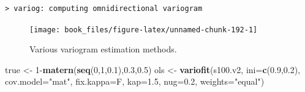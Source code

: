 \documentclass[b5paper,]{book}
\makeatletter
\newenvironment{Shaded}{\begin{snugshade}}{\end{snugshade}}
\newcommand{\KeywordTok}[1]{\textcolor[rgb]{0.13,0.29,0.53}{\textbf{{#1}}}}
\newcommand{\DataTypeTok}[1]{\textcolor[rgb]{0.13,0.29,0.53}{{#1}}}
\newcommand{\DecValTok}[1]{\textcolor[rgb]{0.00,0.00,0.81}{{#1}}}
\newcommand{\FloatTok}[1]{\textcolor[rgb]{0.00,0.00,0.81}{{#1}}}
\newcommand{\StringTok}[1]{\textcolor[rgb]{0.31,0.60,0.02}{{#1}}}
\newcommand{\NormalTok}[1]{{#1}}
\newenvironment{kframe}{%
\medskip{}
\setlength{\fboxsep}{.8em}
 \def\at@end@of@kframe{}%
 \ifinner\ifhmode%
  \def\at@end@of@kframe{\end{minipage}}%
  \begin{minipage}{\columnwidth}%
 \fi\fi%
 \def\FrameCommand##1{\hskip\@totalleftmargin \hskip-\fboxsep
 \colorbox{shadecolor}{##1}\hskip-\fboxsep
     \hskip-\linewidth \hskip-\@totalleftmargin \hskip\columnwidth}%
 \MakeFramed {\advance\hsize-\width
   \@totalleftmargin\z@ \linewidth\hsize
   \@setminipage}}%
 {\par\unskip\endMakeFramed%
 \at@end@of@kframe}
\renewenvironment{Shaded}{\begin{kframe}}{\end{kframe}}
\theoremstyle{definition}
\theoremstyle{definition}
\theoremstyle{definition}
\theoremstyle{remark}
\makeatother
\begin{document}
\begin{verbatim}
> variog: computing omnidirectional variogram
\end{verbatim}

\begin{Shaded}
\end{Shaded}

\begin{figure}

{\centering \texttt{[image: book\_files/figure-latex/unnamed-chunk-192-1]} 

}

\caption{Various variogram estimation methods.}\label{fig:unnamed-chunk-192}
\end{figure}

\begin{Shaded}
\begin{Highlighting}[]
\NormalTok{true <-}\StringTok{ }\DecValTok{1}\NormalTok{-}\KeywordTok{matern}\NormalTok{(}\KeywordTok{seq}\NormalTok{(}\DecValTok{0}\NormalTok{,}\DecValTok{1}\NormalTok{,}\FloatTok{0.1}\NormalTok{),}\FloatTok{0.3}\NormalTok{,}\FloatTok{0.5}\NormalTok{)}
\NormalTok{ols <-}\StringTok{ }\KeywordTok{variofit}\NormalTok{(s100.v2, }\DataTypeTok{ini=}\KeywordTok{c}\NormalTok{(}\FloatTok{0.9}\NormalTok{,}\FloatTok{0.2}\NormalTok{), }\DataTypeTok{cov.model=}\StringTok{"mat"}\NormalTok{,}
                \DataTypeTok{fix.kappa=}\NormalTok{F, }\DataTypeTok{kap=}\FloatTok{1.5}\NormalTok{, }\DataTypeTok{nug=}\FloatTok{0.2}\NormalTok{, }\DataTypeTok{weights=}\StringTok{"equal"}\NormalTok{)}
\end{Highlighting}
\end{Shaded}
\end{document}
